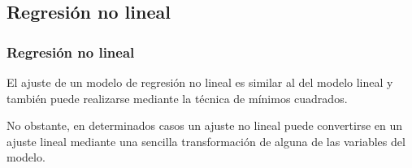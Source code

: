 \subsection{Regresión no lineal}
\begin{frame}
\frametitle{Regresión no lineal}
El ajuste de un modelo de regresión no lineal es similar al del modelo lineal y también puede realizarse mediante la técnica de mínimos cuadrados.
 
No obstante, en determinados casos un ajuste no lineal puede convertirse en un ajuste lineal mediante una sencilla transformación de alguna de las variables del modelo.

\end{frame}


